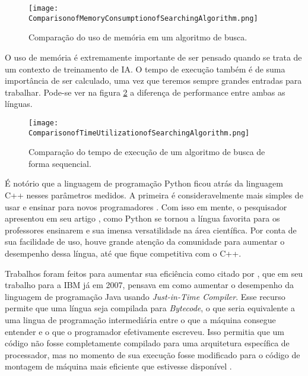 \begin{figure}[!ht]
    \centering
    \texttt{[image: ComparisonofMemoryConsumptionofSearchingAlgorithm.png]}
    \caption[a]{Comparação do uso de memória em um algoritmo de busca\footnotemark.}
    \label{fig:comparisonMemorycppvspython}
\end{figure}


O uso de memória é extremamente importante de ser pensado quando se trata de um contexto de treinamento
de IA. O tempo de execução também é de suma importância de ser calculado, uma vez que teremos sempre
grandes entradas para trabalhar. Pode-se ver na figura \ref{fig:speedcppvspython} a diferença de performance
entre ambas as línguas.

\begin{figure}[!ht]
    \centering
    \texttt{[image: ComparisonofTimeUtilizationofSearchingAlgorithm.png]}
    \caption[a]{Comparação do tempo de execução de um algoritmo de busca de forma sequencial\footnotemark.}
    \label{fig:speedcppvspython}
\end{figure}


É notório que a linguagem de programação Python ficou atrás da linguagem C++ nesses parâmetros medidos.
A primeira é consideravelmente mais simples de usar e ensinar para novos programadores \cite{C++vsPython}.
Com isso em mente, o pesquisador \citeauthor{HPC_Python} apresentou em seu artigo ,
como Python se tornou a língua favorita para os professores ensinarem e sua imensa versatilidade na área científica.
Por conta de sua facilidade de uso, houve grande atenção da comunidade para aumentar o desempenho dessa língua, até
que fique competitiva com o C++.

Trabalhos foram feitos para aumentar sua eficiência como citado por \citeauthor{JIT}, que em seu trabalho
para a IBM já em 2007, pensava em como aumentar o desempenho da linguagem de programação Java usando
\emph{Just-in-Time Compiler}. Esse recurso permite que uma língua seja compilada para \emph{Bytecode}, o que
seria equivalente a uma lingua de programação intermediária entre o que a máquina consegue entender e o que o
programador efetivamente escreveu. Isso permitia que um código não fosse completamente compilado para uma arquitetura
específica de processador, mas no momento de sua execução fosse modificado para o código de montagem de máquina
mais eficiente que estivesse disponível \cite{JIT}.


